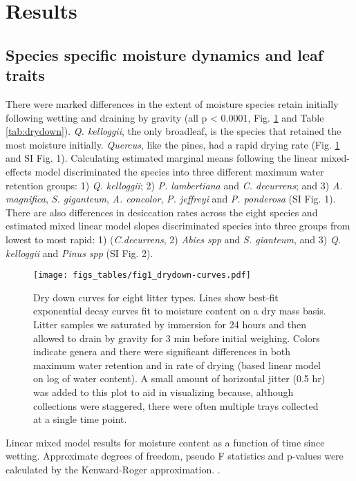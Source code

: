 \documentclass[fire,article,submit,moreauthors,pdftex]{Definitions/mdpi}
\begin{document}
\section{Results}

\subsection{Species specific moisture dynamics and leaf traits}

There were marked differences in the extent of moisture species retain initially
following wetting and draining by gravity (all p < 0.0001, Fig.
\ref{fig:drydown} and Table \ref{tab:drydown}). \emph{Q. kelloggii}, the only
broadleaf, is the species that retained the most moisture initially.
\emph{Quercus}, like the pines, had a rapid drying rate (Fig.
\ref{fig:drydown} and SI Fig. 1). Calculating estimated marginal means following the
linear mixed-effects model discriminated the species into three different
maximum water retention groups: 1) \emph{Q. kelloggii}; 2) \emph{P.
  lambertiana} and \emph{C. decurrens}; and 3) \emph{A. magnifica}, \emph{S.
  giganteum}, \emph{A. concolor}, \emph{P. jeffreyi} and \emph{P. ponderosa}
(SI Fig. 1). There are also differences in desiccation rates across the eight
species and estimated mixed linear model slopes discriminated species into
three groups from lowest to most rapid: 1) (\emph{C.decurrens}, 2) \emph{Abies
  spp} and \emph{S. gianteum}, and 3) \emph{Q. kelloggii} and \emph{Pinus spp}
(SI Fig. 2).

\begin{figure}[H]
  \centering
\texttt{[image: figs\_tables/fig1\_drydown-curves.pdf]}
\caption{Dry down curves for eight litter types. Lines show best-fit
  exponential decay curves fit to moisture content on a dry mass basis. Litter
  samples we saturated by immersion for 24 hours and then allowed to drain by
  gravity for 3 min before initial weighing. Colors indicate genera and there
  were significant differences in both maximum water retention and in rate of drying (based linear model on log of water content). A small amount of horizontal jitter
  (0.5 hr) was added to this plot to aid in visualizing because, although
  collections were staggered, there were often multiple trays collected at a
  single time point.}
 \label{fig:drydown}
\end{figure}


\begin{table}[H]
  \caption{Linear mixed model results for moisture content as a function of time since
    wetting. Approximate degrees of freedom, pseudo F statistics and p-values
    were calculated by the Kenward-Roger approximation.
    \cite{Kenward_Roger-1997}.}
  \label{tab:drydown}
\centering

\end{table}
\end{document}
